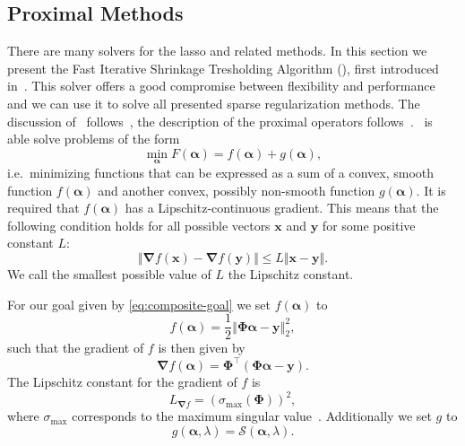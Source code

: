 \subsection{Proximal Methods}
There are many solvers for the lasso and related methods.
In this section we present the Fast Iterative Shrinkage Tresholding Algorithm (\fista), first introduced in~\cite{fista}.
This solver offers a good compromise between flexibility and performance and we
can use it to solve all presented sparse regularization methods.
The discussion of \fista\ follows~\cite{fista}, the description of
the proximal operators follows~\cite{proxsurvey}.
\fista\ is able solve problems of the form
\begin{equation}\label{eq:composite-goal}
\min_{\bm{\alpha}} F(\bm{\alpha}) = f(\bm{\alpha}) + g(\bm{\alpha}),
\end{equation}
i.e.~minimizing functions that can be expressed as a sum of a convex, smooth function \(f(\bm{\alpha})\) and another convex, possibly non-smooth function \(g(\bm{\alpha})\).
It is required that \(f(\bm{\alpha})\) has a Lipschitz-continuous gradient. 
This means that the following condition holds for all possible vectors \(\bm{x}\) and \(\bm{y}\) for some positive constant \(L\):
\begin{equation}   \label{eq:lipschitz}
 \Vert \bm{\nabla} f(\bm{x}) - \bm{\nabla} f(\bm{y}) \Vert \leq L \Vert \bm{x} - \bm{y} \Vert.
\end{equation}
We call the smallest possible value of \(L\) the Lipschitz constant.

For our goal given by \cref{eq:composite-goal} we set \(f(\bm{\alpha})\) to
\begin{equation*}
 f(\bm{\alpha}) = \frac{1}{2} \left\Vert  \bm{\Phi} \bm{\alpha} - \bm{y}   \right\Vert_2^2,
\end{equation*}
such that the gradient of \(f\) is then given by
\begin{equation*}
  \bm{\nabla} f(\bm{\alpha}) = \bm{\Phi}^\intercal \left(\bm{\Phi} \bm{\alpha} - \bm{y} \right).
\end{equation*}
The Lipschitz constant for the gradient of \(f\) is
\begin{equation}
  \label{eq:lipf}
  L_{\bm{\nabla} f} = {\left(\sigma_{\max} \left(\bm{\Phi}\right)\right)}^2,
\end{equation}
where \(\sigma_{\max} \) corresponds to the maximum singular value~\autocite{fista}.
Additionally we set \(g\) to
\begin{equation*}
  g(\bm{\alpha}, \lambda) = \mathcal{S} \left( \bm{\alpha}, \lambda \right).
\end{equation*}

